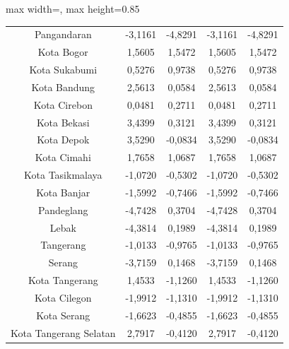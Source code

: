 \begin{table}[H]
\begin{adjustbox}{max width=\textwidth, max height=0.85\textheight}
\begin{tabular}{|c|c|c|c|c|}
Pangandaran & -3,1161 & -4,8291 & -3,1161 & -4,8291 \\
Kota Bogor & 1,5605 & 1,5472 & 1,5605 & 1,5472 \\
Kota Sukabumi & 0,5276 & 0,9738 & 0,5276 & 0,9738 \\
Kota Bandung & 2,5613 & 0,0584 & 2,5613 & 0,0584 \\
Kota Cirebon & 0,0481 & 0,2711 & 0,0481 & 0,2711 \\
Kota Bekasi & 3,4399 & 0,3121 & 3,4399 & 0,3121 \\
Kota Depok & 3,5290 & -0,0834 & 3,5290 & -0,0834 \\
Kota Cimahi & 1,7658 & 1,0687 & 1,7658 & 1,0687 \\
Kota Tasikmalaya & -1,0720 & -0,5302 & -1,0720 & -0,5302 \\
Kota Banjar & -1,5992 & -0,7466 & -1,5992 & -0,7466 \\
Pandeglang & -4,7428 & 0,3704 & -4,7428 & 0,3704 \\
Lebak & -4,3814 & 0,1989 & -4,3814 & 0,1989 \\
Tangerang & -1,0133 & -0,9765 & -1,0133 & -0,9765 \\
Serang & -3,7159 & 0,1468 & -3,7159 & 0,1468 \\
Kota Tangerang & 1,4533 & -1,1260 & 1,4533 & -1,1260 \\
Kota Cilegon & -1,9912 & -1,1310 & -1,9912 & -1,1310 \\
Kota Serang & -1,6623 & -0,4855 & -1,6623 & -0,4855 \\
Kota Tangerang Selatan & 2,7917 & -0,4120 & 2,7917 & -0,4120 \\
\hline
\end{tabular}
\end{adjustbox}
\end{table}